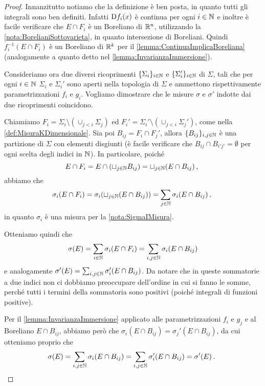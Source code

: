 \begin{proof}
	Innanzitutto notiamo che la definizione è ben posta, in quanto tutti gli integrali sono ben definiti. Infatti $\mathrm D f_i(x)$ è continua per ogni $i\in\mathbb N$ e inoltre è facile verificare che $E\cap F_i$ è un Boreliano di $\mathbb R^n$, utilizzando la \cref{nota:BorelianiSottovarieta}, in quanto intersezione di Boreliani. Quindi $f_i^{-1}(E\cap F_i)$ è un Boreliano di $\mathbb R^k$ per il \cref{lemma:ContinuaImplicaBoreliana} (analogamente a quanto detto nel \cref{lemma:InvarianzaImmersione}).

	Consideriamo ora due diversi ricoprimenti $\{\Sigma_i\}_{i\in\mathbb N}$ e $\{\Sigma_i'\}_{i\in\mathbb N}$ di $\Sigma$, tali che per ogni $i\in\mathbb N$ $\Sigma_i$ e $\Sigma_i'$ sono aperti nella topologia di $\Sigma$ e ammettono rispettivamente parametrizzazioni $f_i$ e $g_i$. Vogliamo dimostrare che le misure $\sigma$ e $\sigma'$ indotte dai due ricoprimenti coincidono.
	
	Chiamiamo $F_i=\Sigma_i\setminus (\cup_{j<i}\Sigma_j)$ ed $F_i'=\Sigma_i'\setminus (\cup_{j<i}\Sigma_j')$, come nella \cref{def:MisuraKDimensionale}. Sia poi $B_{ij}=F_i \cap F_j'$, allora $\{B_{ij}\}_{i,j\in\mathbb N}$ è una partizione di $\Sigma$ con elementi disgiunti (è facile verificare che $B_{ij}\cap B_{i'j'}=\emptyset$ per ogni scelta degli indici in $\mathbb N$). In particolare, poiché
	\begin{equation*}
		E\cap F_i=E\cap (\sqcup_{j\in\mathbb N}B_{ij})=\sqcup_{j\in\mathbb N}(E\cap B_{ij})\, \text{, }
	\end{equation*}
	abbiamo che
	\begin{equation*}
		\sigma_i(E\cap F_i)=\sigma_i(\sqcup_{j\in\mathbb N}(E\cap B_{ij}))=\sum_{j\in\mathbb N}\sigma_i(E\cap B_{ij})\, \text{, }
	\end{equation*}
	in quanto $\sigma_i$ è una misura per la \cref{nota:SigmaIMisura}.
	
	Otteniamo quindi che
	\begin{equation*}
		\sigma(E)=\sum_{i\in\mathbb N}\sigma_i(E \cap F_i)=\sum_{i,j\in\mathbb N} \sigma_i(E\cap B_{ij})
	\end{equation*}
	e analogamente $\sigma'(E)=\sum_{i,j\in\mathbb N} \sigma_i'(E\cap B_{ij})$. Da notare che in queste sommatorie a due indici non ci dobbiamo preoccupare dell'ordine in cui si fanno le somme, perché tutti i termini della sommatoria sono positivi (poiché integrali di funzioni positive).

	Per il \cref{lemma:InvarianzaImmersione} applicato alle parametrizzazioni $f_i$ e $g_j$ e al Boreliano $E\cap B_{ij}$, abbiamo però che $\sigma_i(E\cap B_{ij})=\sigma_j'(E\cap B_{ij})$, da cui otteniamo proprio che 
	\begin{equation*}
		\sigma(E)=\sum_{i,j\in\mathbb N} \sigma_i(E\cap B_{ij})=\sum_{i,j\in\mathbb N} \sigma_i'(E\cap B_{ij})=\sigma'(E)\, \text{. }
	\end{equation*}

\end{proof}


